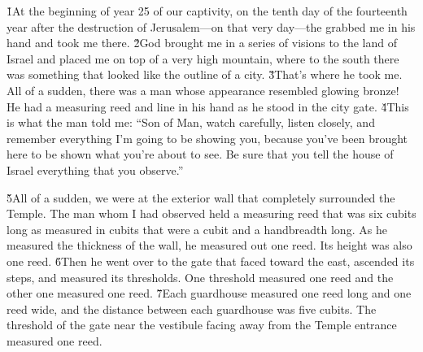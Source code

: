 \v{1}At the beginning of year 25 of our captivity, on the tenth day of the fourteenth year after the destruction of Jerusalem---on that very day---the  grabbed me in his hand and took me there. \v{2}God brought me in a series of visions to the land of Israel and placed me on top of a very high mountain, where to the south there was something that looked like the outline of a city. \v{3}That's where he took me. All of a sudden, there was a man whose appearance resembled glowing bronze! He had a measuring reed and line in his hand as he stood in the city gate. \v{4}This is what the man told me: ``Son of Man, watch carefully, listen closely, and remember everything I'm going to be showing you, because you've been brought here to be shown what you're about to see. Be sure that you tell the house of Israel everything that you observe.''

\v{5}All of a sudden, we were at the exterior wall that completely surrounded the Temple. The man whom I had observed held a measuring reed that was six cubits long as measured in cubits that were a cubit and a handbreadth long. As he measured the thickness of the wall, he measured out one reed. Its height was also one reed. \v{6}Then he went over to the gate that faced toward the east, ascended its steps, and measured its thresholds. One threshold measured one reed and the other one measured one reed. \v{7}Each guardhouse measured one reed long and one reed wide, and the distance between each guardhouse was five cubits. The threshold of the gate near the vestibule facing away from the Temple entrance measured one reed.

